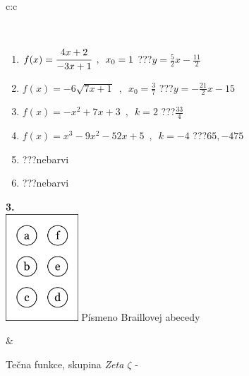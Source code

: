 \documentclass[10pt]{report}
\begin{document}
\begin{tabular}{c:c}
\begin{minipage}[c][104.5mm][t]{0.5\linewidth}
\begin{center}
\begin{minipage}{0.95\linewidth}
\begin{center}
\end{center}
\end{minipage}
\\[1mm]
\begin{minipage}{0.79\linewidth}
\begin{center}
\begin{varwidth}{\linewidth}
\begin{enumerate}
\small
\item $f(x)=\cfrac{4x+2}{-3x+1}\enspace , \enspace x_0=1$\quad \dotfill\; ???\;\dotfill \quad $y = \frac{5}{2}x-\frac{11}{2}$
\item $f(x)=-6\sqrt{7x+1}\enspace , \enspace x_0=\frac{3}{7}$\quad \dotfill\; ???\;\dotfill \quad $y = -\frac{21}{2}x-15$
\item $f(x)=-x^2+7x+3\enspace , \enspace k=2$\quad \dotfill\; ???\;\dotfill \quad $\frac{33}{4}$
\item $f(x)=x^3-9x^2-52x+5\enspace , \enspace k=-4$\quad \dotfill\; ???\;\dotfill \quad $65 , -475$
\item \quad \dotfill\; ???\;\dotfill \quad nebarvi
\item \quad \dotfill\; ???\;\dotfill \quad nebarvi
\end{enumerate}
\end{varwidth}
\end{center}
\end{minipage}
\begin{minipage}{0.20\linewidth}
\begin{center}
{\Huge\bfseries 3.} \\[2mm]
\includegraphics[height=40mm]{../images/braille.png}
{\small Písmeno Braillovej abecedy}
\end{center}
\end{minipage}
\end{center}
\end{minipage}
&
\begin{minipage}[c][104.5mm][t]{0.5\linewidth}
\begin{center}
\vspace{7mm}
{\huge Tečna funkce, skupina \textit{Zeta $\zeta$} -}\\[5mm]

\end{center}
\end{minipage}
\end{tabular}
\end{document}
